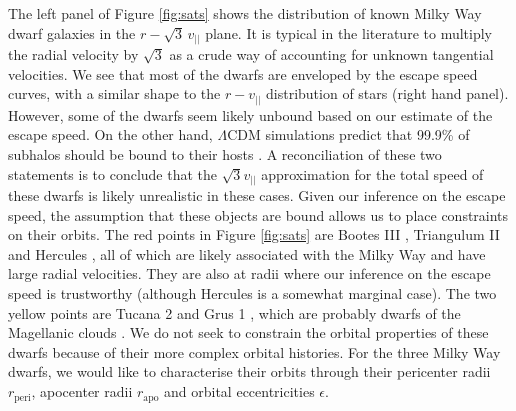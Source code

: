 \documentclass[useAMS,twocolumn,usenatbib]{mn2e}
\def\vlos{{v_{||}}}
\def\rp{{r_\mathrm{peri}}}
\def\ra{{r_\mathrm{apo}}}
\def\ecc{{\epsilon}}
\begin{document}
The left panel of Figure \ref{fig:sats} shows the distribution of known Milky Way dwarf galaxies in the $r-\sqrt{3}\,\vlos$ plane. 
It is typical in the literature to multiply the radial velocity by $\sqrt{3}$ as a crude way of accounting for unknown tangential velocities. 
We see that most of the dwarfs are enveloped by the escape speed curves, with a similar shape to the $r-\vlos$ distribution of stars (right hand panel).
However, some of the dwarfs seem likely unbound based on our estimate of the escape speed. 
On the other hand, $\Lambda$CDM simulations predict that 99.9\% of subhalos should be bound to their hosts \citep{Bo13}. 
A reconciliation of these two statements is to conclude that the $\sqrt{3}\vlos$ approximation for the total speed of these dwarfs is likely unrealistic in these cases. 
Given our inference on the escape speed, the assumption that these objects are bound allows us to place constraints on their orbits. 
The red points in Figure \ref{fig:sats} are Bootes III \citep{Gr09}, Triangulum II \citep{La15} and Hercules \citep{Be07}, all of which are likely associated with the Milky Way and have large radial velocities. 
They are also at radii where our inference on the escape speed is trustworthy (although Hercules is a somewhat marginal case).  
The two yellow points are Tucana 2 and Grus 1 \citep{Ko15,Be15}, which are probably dwarfs of the Magellanic clouds \citep{Je16}. 
We do not seek to constrain the orbital properties of these dwarfs because of their more complex orbital histories. 
For the three Milky Way dwarfs, we would like to characterise their orbits through their pericenter radii $\rp$, apocenter radii $\ra$ and orbital eccentricities $\ecc$.
\end{document}
